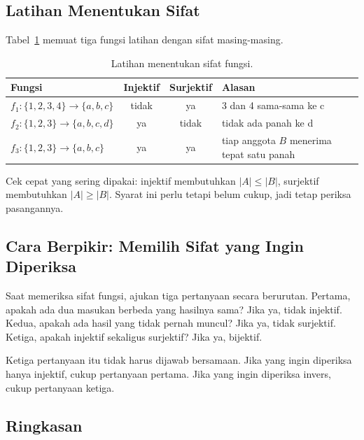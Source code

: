 \documentclass[11pt,a4paper]{article}
\begin{document}
\subsection{Latihan Menentukan Sifat}

Tabel~\ref{tab:latihan-sifat} memuat tiga fungsi latihan dengan sifat masing-masing.

\begin{table}[H]
	\centering
	\caption{Latihan menentukan sifat fungsi.}
	\label{tab:latihan-sifat}
	\footnotesize
	\begin{tabularx}{\textwidth}{l c c X}
		\toprule
		Fungsi                          & Injektif & Surjektif & Alasan                                     \\
		\midrule
		$f_1:\{1,2,3,4\} \to \{a,b,c\}$ & tidak    & ya        & 3 dan 4 sama-sama ke c                     \\
		$f_2:\{1,2,3\} \to \{a,b,c,d\}$ & ya       & tidak     & tidak ada panah ke d                       \\
		$f_3:\{1,2,3\} \to \{a,b,c\}$   & ya       & ya        & tiap anggota $B$ menerima tepat satu panah \\
		\bottomrule
	\end{tabularx}
\end{table}

Cek cepat yang sering dipakai: injektif membutuhkan $|A| \le |B|$, surjektif membutuhkan $|A| \ge |B|$. Syarat ini perlu tetapi belum cukup, jadi tetap periksa pasangannya.

\subsection{Cara Berpikir: Memilih Sifat yang Ingin Diperiksa}

Saat memeriksa sifat fungsi, ajukan tiga pertanyaan secara berurutan. Pertama, apakah ada dua masukan berbeda yang hasilnya sama? Jika ya, tidak injektif. Kedua, apakah ada hasil yang tidak pernah muncul? Jika ya, tidak surjektif. Ketiga, apakah injektif sekaligus surjektif? Jika ya, bijektif.

Ketiga pertanyaan itu tidak harus dijawab bersamaan. Jika yang ingin diperiksa hanya injektif, cukup pertanyaan pertama. Jika yang ingin diperiksa invers, cukup pertanyaan ketiga.

\subsection{Ringkasan}
\end{document}
